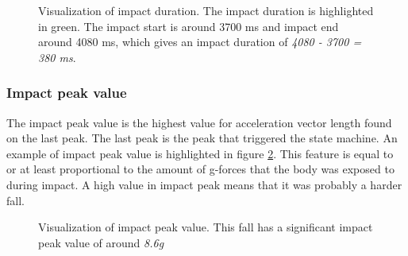 \documentclass[12pt, a4paper, onecolumn]{article}
\begin{document}
	\begin{figure}[H]
		\centering
		\caption{Visualization of impact duration. The impact duration is highlighted in green. The impact start is around 3700 ms and impact end around 4080 ms, which gives an impact duration of \textit{4080 - 3700 = 380 ms}.}%
		\label{fig:fall-data-impact-duration}%
	\end{figure}
	
	\subsubsection{Impact peak value}
	
	The impact peak value is the highest value for acceleration vector length found on the last peak. The last peak is the peak that triggered the state machine. An example of impact peak value is highlighted in figure \ref{fig:fall-data-impact-peak}. This feature is equal to or at least proportional to the amount of g-forces that the body was exposed to during impact. A high value in impact peak means that it was probably a harder fall.
	
	\begin{figure}[H]
		\centering
		\caption{Visualization of impact peak value. This fall has a significant impact peak value of around \textit{8.6g}}%
		\label{fig:fall-data-impact-peak}%
	\end{figure}
	
\end{document}
